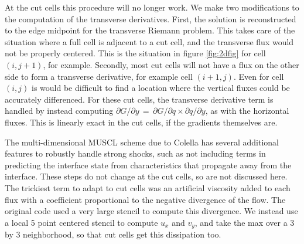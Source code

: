 At the cut cells this procedure will no longer work.   We make two modifications to the
computation of the transverse derivatives. First,
the solution is reconstructed to the edge midpoint  for the transverse Riemann problem.
This takes care of the situation where a full cell is adjacent to a cut cell, and
the transverse flux would not be properly centered. This is the situation
in figure \ref{fig:2dfig} for cell $(i,j+1)$, for example.
Secondly, most cut cells will not have a flux on the other side to form a
transverse derivative, for example cell $(i+1,j)$. Even for cell $(i,j)$ is would
be difficult to find a location where the vertical fluxes could be accurately differenced.
For these cut cells, the transverse derivative term is handled by instead computing
$ \partial G / \partial y \, = \,  \partial G / \partial q \times \partial q / \partial y$,
as with the horizontal fluxes. This is linearly exact in the cut cells, 
if the gradients themselves are.


The multi-dimensional MUSCL scheme due to Colella has several additional
features to robustly handle strong shocks, such as not including terms in
predicting the interface state from characteristics that propagate 
away from the interface. These
steps do not change at the cut cells, so are not discussed here.  The
trickiest term to adapt to cut cells was an artificial viscosity 
added to each flux with a
coefficient proportional to the negative divergence of the flow.  The original
code used a very large stencil to compute this divergence. We instead use a local 5
point centered stencil to compute $u_x$ and $v_y$, and take the max over a 3 by 3
neighborhood, so that cut cells get this dissipation too.

